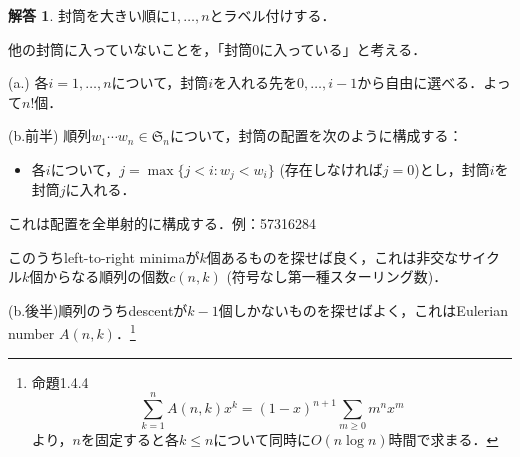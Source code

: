 \documentclass[xelatex,ja=standard,a4paper,14pt,everyparhook=compat]{bxjsarticle}
\newcommand{\frakS}{\mathfrak{S}}
\theoremstyle{definition}
\newtheorem*{answer}{解答}
\begin{document}
\begin{answer}
    封筒を大きい順に$1,\ldots,n$とラベル付けする．

    他の封筒に入っていないことを，「封筒$0$に入っている」と考える．

    (a.) 各$i=1,\ldots,n$について，封筒$i$を入れる先を$0,\ldots,i-1$から自由に選べる．よって$n!$個．

    (b.前半) 順列$w_1\cdots w_n \in \frakS_n$について，封筒の配置を次のように構成する： \begin{itemize}
        \item 各$i$について，$j = \max\{j < i : w_j < w_i\}$ (存在しなければ$j=0$)とし，封筒$i$を封筒$j$に入れる．
    \end{itemize}
    これは配置を全単射的に構成する．例：57316284

    このうちleft-to-right minimaが$k$個あるものを探せば良く，これは非交なサイクル$k$個からなる順列の個数$c(n, k)$ (符号なし第一種スターリング数)．

    (b.後半)順列のうちdescentが$k-1$個しかないものを探せばよく，これはEulerian number $A(n,k)$．\footnote{命題1.4.4 \begin{equation*}
            \sum_{k=1}^n A(n,k) x^k = (1-x)^{n+1} \sum_{m \geq 0} m^n x^m
        \end{equation*}より，$n$を固定すると各$k \leq n$について同時に$O(n \log n)$時間で求まる．}
\end{answer}
\end{document}
